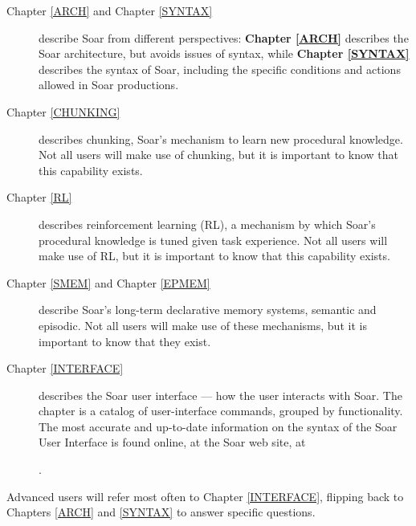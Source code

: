 \begin{description}
\item[Chapter \ref{ARCH} and Chapter \ref{SYNTAX}] describe Soar from
different perspectives: \textbf{Chapter \ref{ARCH}} describes the Soar
architecture, but avoids issues of syntax, while \textbf{Chapter \ref{SYNTAX}}
describes the syntax of Soar, including the specific conditions and actions
allowed in Soar productions.

\item[Chapter \ref{CHUNKING}] describes chunking, Soar's
mechanism to learn new procedural knowledge.  Not all users will make use of 
chunking, but it is important to know that this capability exists.

\item[Chapter \ref{RL}] describes reinforcement learning (RL), a mechanism
by which Soar's procedural knowledge is tuned given task experience.
Not all users will make use of RL, but it is important to know that this capability exists.

\item[Chapter \ref{SMEM} and Chapter \ref{EPMEM}] describe Soar's long-term declarative
memory systems, semantic and episodic. Not all users will make use of these mechanisms, 
but it is important to know that they exist.

\item[Chapter \ref{INTERFACE}] describes the Soar user interface --- how the
user interacts with Soar. The chapter is a catalog of user-interface commands,
grouped by functionality.  The most accurate and up-to-date information on the syntax of the 
Soar User Interface is found online, at the Soar web site, at

{\footnotesize
{}.
}

\end{description}

Advanced users will refer most often to Chapter \ref{INTERFACE}, flipping back
to Chapters \ref{ARCH} and \ref{SYNTAX} to answer specific questions.

